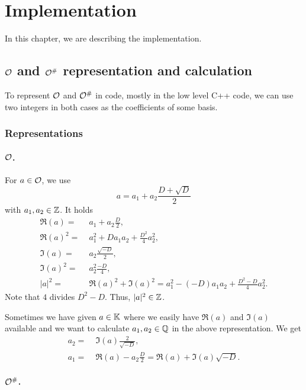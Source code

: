 
\section{Implementation}

In this chapter, we are describing the implementation.

\subsection{$\mathcal{O}$ and $\mathcal{O}^\#$ representation and calculation}

To represent $\mathcal{O}$ and $\mathcal{O}^\#$ in code, mostly in the low level C++ code, we can use two integers in both cases as the coefficients of some basis.

\subsubsection{Representations}

\paragraph{$\mathcal{O}$.}

For $a \in \mathcal{O}$, we use
\[ a = a_1 + a_2 \frac{D + \sqrt{D}} {2} \]
with $a_1,a_2 \in \mathbb{Z}$.
It holds
\begin{align*}
\Re(a) = &\; a_1 + a_2 \frac{D}{2} , \\
\Re(a)^2 =&\; a_1^2 + D a_1 a_2 + \frac{D^2}{4} a_2^2 , \\
\Im(a) =&\; a_2 \frac{\sqrt{-D}}{2} , \\
\Im(a)^2 =&\; a_2^2 \frac{-D}{4} , \\
|a|^2 =&\; \Re(a)^2 + \Im(a)^2 = a_1^2 - (-D) a_1 a_2 + \frac{D^2-D}{4} a_2^2 .
\end{align*}
Note that $4$ divides $D^2 - D$. Thus, $|a|^2 \in \mathbb{Z}$.

Sometimes we have given $a \in \mathbb{K}$ where we easily have $\Re(a)$ and $\Im(a)$ available and we want to calculate $a_1, a_2 \in \mathbb{Q}$ in the above representation. We get
\begin{align*}
a_2 = &\; \Im(a) \frac{2}{\sqrt{-D}}, \\
a_1 = &\; \Re(a) - a_2 \frac{D}{2} = \Re(a) + \Im(a) \sqrt{-D} .
\end{align*}

\paragraph{$\mathcal{O}^\#$.}

